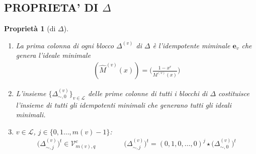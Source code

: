 \documentclass[mathserif]{beamer}
\def\quotient#1#2{%
   \raise1ex\hbox{$#1$}\Big/\lower1ex\hbox{$#2$}%
}
\newtheorem{prop}{Proprietà}
\begin{document}
\subsection{PROPRIETA' DI $\Delta$}

\begin{frame}
    \begin{prop}[di $\Delta$]
    \begin{enumerate}
      \item  La prima colonna di ogni blocco $\Delta^{(v)}$ di $\Delta$ è l'idempotente miminale $\mathbf{e}_{v}$ che genera l'ideale minimale
      \begin{align*}
	  (\hat{M}^{(v)}(x)) = \Big(\frac{1-x^r}{M^{(v)}(x)} \Big)
      \end{align*}
      \item L'insieme $\lbrace \Delta_{\sim, 0}^{(v)} \rbrace_{v\in \mathscr{L}}$ delle prime colonne di tutti i blocchi di $\Delta$ costituisce l'insieme di tutti gli idempotenti minimali che generano tutti gli ideali minimali.
      \item  $v \in \mathscr{L}$, $j \in \lbrace 0, 1 \dots , m(v)-1 \rbrace$:
      \begin{align*}
      \big( \Delta_{\sim, j}^{(v)} \big)^{t} \in \mathcal{V}_{m(v), q}^{c}
      \qquad \qquad
      \big( \Delta_{\sim, j}^{(v)} \big)^{t}  =  (0,1,0,\dots,0)^{j} \star \big( \Delta_{\sim, 0}^{(v)} \big)^{t}
      \end{align*}
    \end{enumerate}
    \end{prop}
\end{frame}
\end{document}
